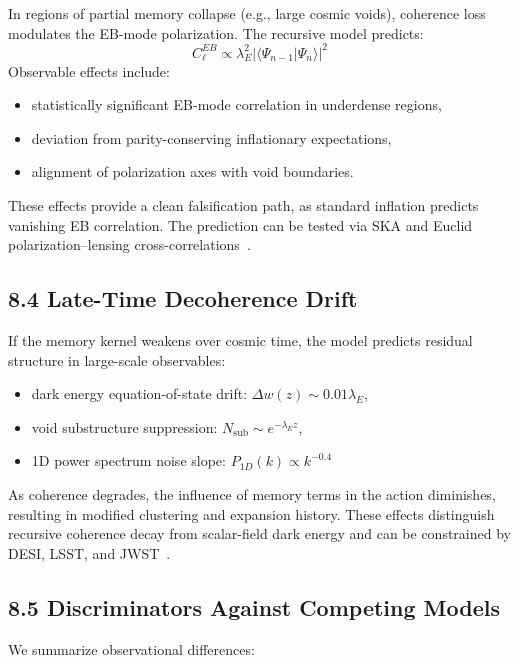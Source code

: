 In regions of partial memory collapse (e.g., large cosmic voids), coherence loss modulates the EB-mode polarization. The recursive model predicts:
\[
C_\ell^{EB} \propto \lambda_E^2 |\langle \Psi_{n-1} | \Psi_n \rangle|^2
\]
Observable effects include:
\begin{itemize}
    \item statistically significant EB-mode correlation in underdense regions,
    \item deviation from parity-conserving inflationary expectations,
    \item alignment of polarization axes with void boundaries.
\end{itemize}
These effects provide a clean falsification path, as standard inflation predicts vanishing EB correlation. The prediction can be tested via SKA and Euclid polarization–lensing cross-correlations~\cite{laureijs2011euclid, dewdney2009ska}.

\subsection{8.4 Late-Time Decoherence Drift}

If the memory kernel weakens over cosmic time, the model predicts residual structure in large-scale observables:
\begin{itemize}
    \item dark energy equation-of-state drift: \( \Delta w(z) \sim 0.01 \lambda_E \),
    \item void substructure suppression: \( N_{\text{sub}} \sim e^{-\lambda_E z} \),
    \item 1D power spectrum noise slope: \( P_{1D}(k) \propto k^{-0.4} \)
\end{itemize}
As coherence degrades, the influence of memory terms in the action diminishes, resulting in modified clustering and expansion history. These effects distinguish recursive coherence decay from scalar-field dark energy and can be constrained by DESI, LSST, and JWST~\cite{ivezic2019lsst, desi2016experiment}.

\subsection{8.5 Discriminators Against Competing Models}

We summarize observational differences:


